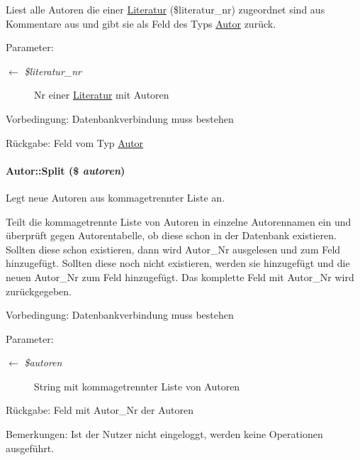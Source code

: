 Liest alle Autoren die einer \hyperlink{classLiteratur}{Literatur} (\$literatur\_\-nr) zugeordnet sind aus Kommentare aus und gibt sie als Feld des Typs \hyperlink{classAutor}{Autor} zurück. \begin{Desc}
\item[Parameter:]
\begin{description}
\item[\mbox{$\leftarrow$} {\em \$literatur\_\-nr}]Nr einer \hyperlink{classLiteratur}{Literatur} mit Autoren \end{description}
\end{Desc}
\begin{Desc}
\item[Vorbedingung:]Datenbankverbindung muss bestehen \end{Desc}
\begin{Desc}
\item[R\"{u}ckgabe:]Feld vom Typ \hyperlink{classAutor}{Autor} \end{Desc}
\hypertarget{classAutor_2ba5418b6622f414fa8a054e6c2a2db8}{
\paragraph[Split]{\setlength{\rightskip}{0pt plus 5cm}Autor::Split (\$ {\em autoren})}\hfill}
\label{classAutor_2ba5418b6622f414fa8a054e6c2a2db8}


Legt neue Autoren aus kommagetrennter Liste an. 

Teilt die kommagetrennte Liste von Autoren in einzelne Autorennamen ein und überprüft gegen Autorentabelle, ob diese schon in der Datenbank existieren. Sollten diese schon existieren, dann wird Autor\_\-Nr ausgelesen und zum Feld hinzugefügt. Sollten diese noch nicht existieren, werden sie hinzugefügt und die neuen Autor\_\-Nr zum Feld hinzugefügt. Das komplette Feld mit Autor\_\-Nr wird zurückgegeben. \begin{Desc}
\item[Vorbedingung:]Datenbankverbindung muss bestehen \end{Desc}
\begin{Desc}
\item[Parameter:]
\begin{description}
\item[\mbox{$\leftarrow$} {\em \$autoren}]String mit kommagetrennter Liste von Autoren \end{description}
\end{Desc}
\begin{Desc}
\item[R\"{u}ckgabe:]Feld mit Autor\_\-Nr der Autoren \end{Desc}
\begin{Desc}
\item[Bemerkungen:]Ist der Nutzer nicht eingeloggt, werden keine Operationen ausgeführt. \end{Desc}


